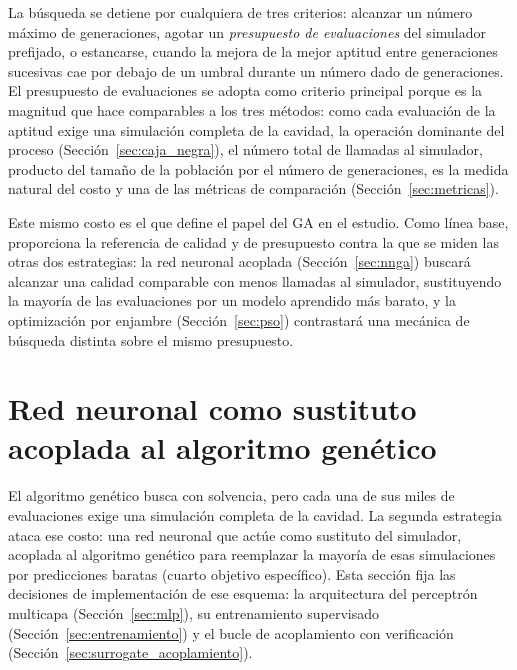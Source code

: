 La búsqueda se detiene por cualquiera de tres criterios: alcanzar un número máximo de
generaciones, agotar un \emph{presupuesto de evaluaciones} del simulador prefijado, o
estancarse, cuando la mejora de la mejor aptitud entre generaciones sucesivas cae por
debajo de un umbral durante un número dado de generaciones. El presupuesto de
evaluaciones se adopta como criterio principal porque es la magnitud que hace
comparables a los tres métodos: como cada evaluación de la aptitud exige una
simulación completa de la cavidad, la operación dominante del proceso
(Sección~\ref{sec:caja_negra}), el número total de llamadas al simulador, producto
del tamaño de la población por el número de generaciones, es la medida natural del
costo y una de las métricas de comparación (Sección~\ref{sec:metricas}).

Este mismo costo es el que define el papel del GA en el estudio. Como línea base,
proporciona la referencia de calidad y de presupuesto contra la que se miden las
otras dos estrategias: la red neuronal acoplada (Sección~\ref{sec:nnga}) buscará
alcanzar una calidad comparable con menos llamadas al simulador, sustituyendo la
mayoría de las evaluaciones por un modelo aprendido más barato, y la optimización por
enjambre (Sección~\ref{sec:pso}) contrastará una mecánica de búsqueda distinta sobre
el mismo presupuesto.



\section{Red neuronal como sustituto acoplada al algoritmo genético}
\label{sec:nnga_impl}

El algoritmo genético busca con solvencia, pero cada una de sus miles de evaluaciones exige una simulación completa de la cavidad. La segunda estrategia ataca ese costo: una red neuronal que actúe como sustituto del simulador, acoplada al algoritmo genético para reemplazar la mayoría de esas simulaciones por predicciones baratas (cuarto objetivo específico). Esta sección fija las decisiones de implementación de ese esquema: la arquitectura del perceptrón multicapa (Sección~\ref{sec:mlp}), su entrenamiento supervisado (Sección~\ref{sec:entrenamiento}) y el bucle de acoplamiento con verificación (Sección~\ref{sec:surrogate_acoplamiento}).

